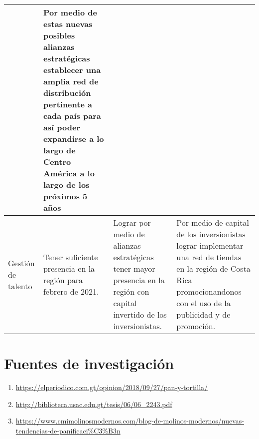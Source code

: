 \documentclass{article}
\begin{document}
\begin{center}
\begin{supertabular}{ |p{1.5cm}|p{4cm}|p{4cm}|p{4cm}| }
            & Por medio de estas nuevas posibles alianzas estratégicas establecer una amplia red de distribución pertinente a cada país para así poder expandirse a lo largo de Centro América a lo largo de los próximos 5 años \\ 
        \hline
            Gestión de talento 
            & Tener suficiente presencia en la región para febrero de 2021. 
            & Lograr por medio de alianzas estratégicas tener mayor presencia en la región con capital invertido de los inversionistas. 
            & Por medio de capital de los inversionistas lograr implementar una red de tiendas en la región de Costa Rica promocionandonos con el uso de la publicidad y de promoción.  \\ 
        \hline
    \end{supertabular}
\end{center}


\section{Fuentes de investigación}  
\begin{enumerate}
    \item \url{https://elperiodico.com.gt/opinion/2018/09/27/pan-y-tortilla/}
    \item \url{http://biblioteca.usac.edu.gt/tesis/06/06_2243.pdf}
    \item \url{https://www.cmimolinosmodernos.com/blog-de-molinos-modernos/nuevas-tendencias-de-panificaci%C3%B3n}
\end{enumerate}
\end{document}
